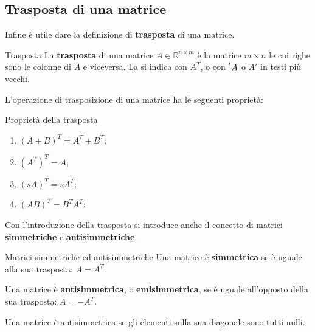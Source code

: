 \subsection{Trasposta di una matrice}
Infine è utile dare la definizione di \textbf{trasposta} di una matrice.
\begin{newdef}{Trasposta}
    La \textbf{trasposta} di una matrice $A \in \mathbb{R}^{n \times m}$ è la matrice $m \times n$ le cui righe sono le colonne di $A$ e viceversa. La si indica con $A^T$, o con $\prescript{t}{}{A}$ o $A'$ in testi più vecchi.
\end{newdef}
L'operazione di trasposizione di una matrice ha le seguenti proprietà:
\begin{teo}{Proprietà della trasposta}
    \begin{enumerate}
        \item $(A + B)^T = A^T + B^T$;
        \item $(A^T)^T = A$;
        \item $(sA)^T = sA^T$;
        \item $(AB)^T = B^T A^T$;
    \end{enumerate}
\end{teo}
Con l'introduzione della trasposta si introduce anche il concetto di matrici \textbf{simmetriche} e \textbf{antisimmetriche}.
\begin{newdef}{Matrici simmetriche ed antisimmetriche}
    Una matrice è \textbf{simmetrica} se è uguale alla sua trasposta: $A = A^T$.

    Una matrice è \textbf{antisimmetrica}, o \textbf{emisimmetrica}, se è uguale all'opposto della sua trasposta: $A = -A^T$.
\end{newdef}
\begin{nb}
    Una matrice è antisimmetrica se gli elementi sulla sua diagonale sono tutti nulli.
\end{nb}
